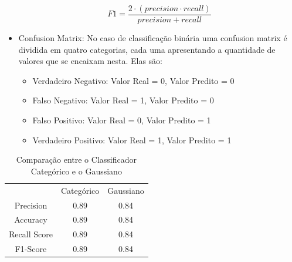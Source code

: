 \documentclass[conference]{IEEEtran}
\begin{document}
\begin{itemize}
\begin{equation}
    F1 = \frac{2\cdot(precision\cdot recall)}{precision + recall}
\end{equation}
\cite{b2}
\item Confusion Matrix:
No caso de classificação binária uma confusion matrix é dividida em quatro categorias, cada uma apresentando a quantidade de valores que se encaixam nesta. Elas são:
\begin{itemize}
\item Verdadeiro Negativo: Valor Real = 0, Valor Predito = 0
\item Falso Negativo: Valor Real = 1, Valor Predito = 0
\item Falso Positivo: Valor Real = 0, Valor Predito = 1
\item Verdadeiro Positivo: Valor Real = 1, Valor Predito = 1
\cite{b8}
\end{itemize}
\end{itemize}
\begin{table}[H]
	\centering
    \caption{\label{tab:cr1-gt} Comparação entre o Classificador Categórico e o Gaussiano}
    \begin{small}
        \begin{tabular}{ccc}
        	\\
        	\\
            \hline
                                    & Categórico       & Gaussiano\\
            \hline
            Precision               & 0.89             & 0.84\\
            Accuracy                & 0.89             & 0.84\\
            Recall Score            & 0.89             & 0.84\\
            F1-Score                & 0.89             & 0.84\\
            
            \hline
        \end{tabular}
    \end{small}
\end{table}
\end{document}
